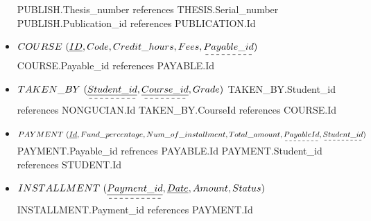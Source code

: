 \documentclass[a4paper]{article}
\begin{document}
\begin{itemize}
    \newline PUBLISH.Thesis\_number references THESIS.Serial\_number 
    \newline PUBLISH.Publication\_id references PUBLICATION.Id
\newline
\item$ COURSE\ (\underline{ID}, Code, Credit\_hours, Fees, \dashuline{Payable\_id})$
    \newline COURSE.Payable\_id references PAYABLE.Id
\newline
\item$ TAKEN\_BY \ (\dashuline{\underline{Student\_id}}, \dashuline{\underline{Course\_id}}, Grade)$
    \newline TAKEN\_BY.Student\_id references NONGUCIAN.Id 
    \newline TAKEN\_BY.CourseId references COURSE.Id 
\newline
\item$ PAYMENT \ (\underline{Id}, Fund\_percentage, Num\_of\_installment, Total\_amount, \dashuline{PayableId},\dashuline{Student\_id })$
    \newline PAYMENT.Payable\_id refrences PAYABLE.Id 
    \newline PAYMENT.Student\_id references STUDENT.Id
\newline 
\item$ INSTALLMENT\ (\dashuline{ \underline{Payment\_id}}, \underline{Date}, Amount, Status) $ 
    \newline INSTALLMENT.Payment\_id references PAYMENT.Id 

    
\end{itemize}
\end{document}
